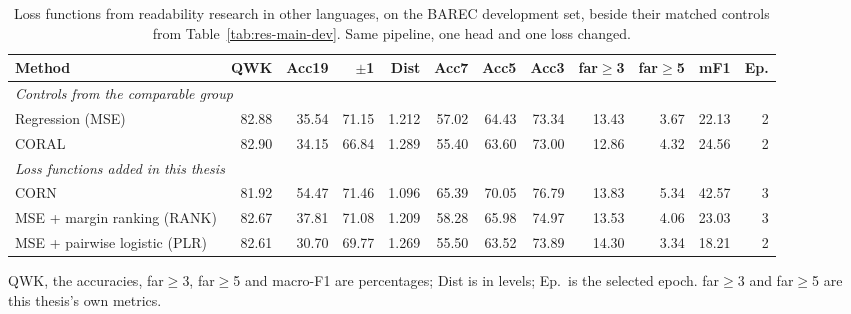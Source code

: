 \begin{table}[H]
\centering
\footnotesize
\caption{Loss functions from readability research in other languages, on the BAREC development set, beside their matched controls from Table~\ref{tab:res-main-dev}. Same pipeline, one head and one loss changed.}
\label{tab:res-newloss-dev}
\begin{adjustbox}{max width=\textwidth}
\begin{tabular}{lrrrrrrrrrrr}
\toprule
\textbf{Method} & \textbf{QWK} & \textbf{Acc19} & \textbf{$\pm$1} & \textbf{Dist} & \textbf{Acc7} & \textbf{Acc5} & \textbf{Acc3} & \textbf{far$\geq$3} & \textbf{far$\geq$5} & \textbf{mF1} & \textbf{Ep.} \\
\midrule
\multicolumn{12}{l}{\textit{Controls from the comparable group}} \\
\midrule
Regression (MSE) & 82.88 & 35.54 & 71.15 & 1.212 & 57.02 & 64.43 & 73.34 & 13.43 & 3.67 & 22.13 & 2 \\
CORAL & 82.90 & 34.15 & 66.84 & 1.289 & 55.40 & 63.60 & 73.00 & 12.86 & 4.32 & 24.56 & 2 \\
\midrule
\multicolumn{12}{l}{\textit{Loss functions added in this thesis}} \\
\midrule
CORN & 81.92 & 54.47 & 71.46 & 1.096 & 65.39 & 70.05 & 76.79 & 13.83 & 5.34 & 42.57 & 3 \\
MSE + margin ranking (RANK) & 82.67 & 37.81 & 71.08 & 1.209 & 58.28 & 65.98 & 74.97 & 13.53 & 4.06 & 23.03 & 3 \\
MSE + pairwise logistic (PLR) & 82.61 & 30.70 & 69.77 & 1.269 & 55.50 & 63.52 & 73.89 & 14.30 & 3.34 & 18.21 & 2 \\
\bottomrule
\end{tabular}
\end{adjustbox}

\vspace{0.1cm}
{\footnotesize QWK, the accuracies, far$\geq$3, far$\geq$5 and macro-F1 are percentages; Dist is in levels; Ep.\ is the selected epoch. far$\geq$3 and far$\geq$5 are this thesis's own metrics.}
\end{table}
